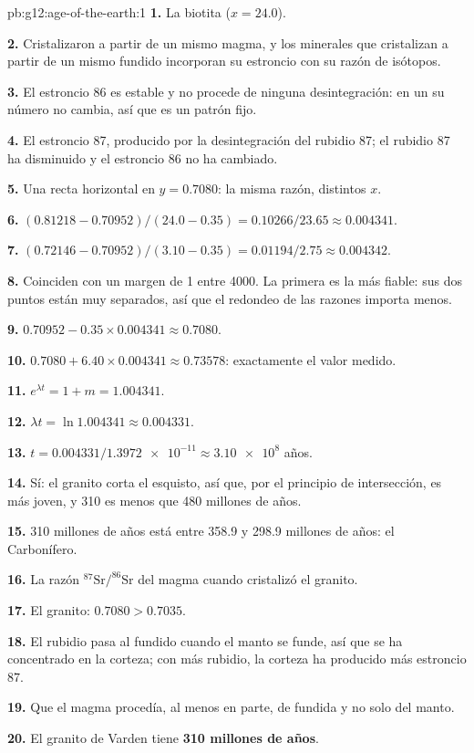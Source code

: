 \begin{solution}{pb:g12:age-of-the-earth:1}
\textbf{1.} La biotita ($x = 24.0$).

\textbf{2.} Cristalizaron a partir de un mismo magma, y los minerales que
cristalizan a partir de un mismo fundido incorporan su estroncio con su razón
de isótopos.

\textbf{3.} El estroncio 86 es estable y no procede de ninguna desintegración:
en un  su número no cambia, así que es un patrón fijo.

\textbf{4.} El estroncio 87, producido por la desintegración del rubidio 87;
el rubidio 87 ha disminuido y el estroncio 86 no ha cambiado.

\textbf{5.} Una recta horizontal en $y = 0.7080$: la misma razón, distintos $x$.

\textbf{6.} $(0.81218 - 0.70952)/(24.0 - 0.35) = 0.10266/23.65 \approx
0.004341$.

\textbf{7.} $(0.72146 - 0.70952)/(3.10 - 0.35) = 0.01194/2.75 \approx
0.004342$.

\textbf{8.} Coinciden con un margen de 1 entre 4000. La primera es la más
fiable: sus dos puntos están muy separados, así que el redondeo de las razones
importa menos.

\textbf{9.} $0.70952 - 0.35 \times 0.004341 \approx 0.7080$.

\textbf{10.} $0.7080 + 6.40 \times 0.004341 \approx 0.73578$: exactamente el
valor medido.

\textbf{11.} $e^{\lambda t} = 1 + m = 1.004341$.

\textbf{12.} $\lambda t = \ln 1.004341 \approx 0.004331$.

\textbf{13.} $t = 0.004331/\num{1.3972e-11} \approx \num{3.10e8}$ años.

\textbf{14.} Sí: el granito corta el esquisto, así que, por el principio de
intersección, es más joven, y 310 es menos que 480 millones de años.

\textbf{15.} 310 millones de años está entre 358.9 y 298.9 millones de años:
el Carbonífero.

\textbf{16.} La razón $^{87}\mathrm{Sr}/^{86}\mathrm{Sr}$ del magma cuando
cristalizó el granito.

\textbf{17.} El granito: $0.7080 > 0.7035$.

\textbf{18.} El rubidio pasa al fundido cuando el manto se funde, así que se
ha concentrado en la corteza; con más rubidio, la corteza ha producido más
estroncio 87.

\textbf{19.} Que el magma procedía, al menos en parte, de 
fundida y no solo del manto.

\textbf{20.} El granito de Varden tiene \textbf{310 millones de años}.
\end{solution}
